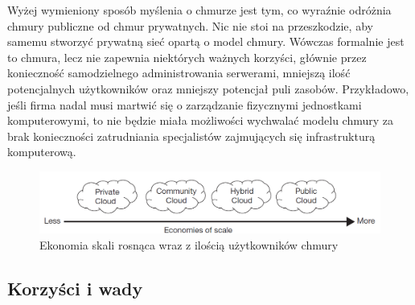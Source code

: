 \documentclass[12pt,a4paper,twoside,titlepage,openright]{book}
\begin{document}
Wyżej wymieniony sposób myślenia o chmurze jest tym, co wyraźnie odróżnia chmury publiczne od chmur prywatnych. Nic nie stoi na przeszkodzie, aby samemu stworzyć prywatną sieć opartą o model chmury. Wówczas formalnie jest to chmura, lecz nie zapewnia niektórych ważnych korzyści, głównie przez konieczność samodzielnego administrowania serwerami, mniejszą ilość potencjalnych użytkowników oraz mniejszy potencjał puli zasobów. Przykładowo, jeśli firma nadal musi martwić się o zarządzanie fizycznymi jednostkami komputerowymi, to nie będzie miała możliwości wychwalać modelu chmury za brak konieczności zatrudniania specjalistów zajmujących się infrastrukturą komputerową.

\begin{figure}[h]
	\centering
			\includegraphics[width=\textwidth]{ekonomia-skali.png}
		\caption{Ekonomia skali rosnąca wraz z ilością użytkowników chmury \cite{ccCambridge}}
		\label{fig:ekonomia-skali}
\end{figure}

\subsection*{Korzyści i wady}
\end{document}
